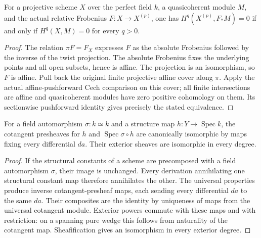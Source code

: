 \begin{theorem}
\label{thm:kn-relative-frobenius-pushforward-cohomology}
\leanok
{}
For a projective scheme $X$ over the perfect field $k$, a quasicoherent
module $M$, and the actual relative Frobenius $F:X\to X^{(p)}$, one has
$H^q(X^{(p)},F_*M)=0$ if and only if $H^q(X,M)=0$ for every $q>0$.
\end{theorem}
\begin{proof}
The relation $\pi F=F_X$ expresses $F$ as the absolute Frobenius
followed by the inverse of the twist projection.  The absolute
Frobenius fixes the underlying points and all open subsets, hence
is affine.  The projection is an isomorphism, so $F$ is affine.
Pull back the original finite projective affine cover along $\pi$.
Apply the actual affine-pushforward Cech comparison on this cover;
all finite intersections are affine and quasicoherent modules have
zero positive cohomology on them.  Its sectionwise pushforward
identity gives precisely the stated equivalence.
\end{proof}

\begin{lemma}
\label{lem:kn-field-automorphism-differentials}
\leanok
For a field automorphism $\sigma:k\simeq k$ and a structure map
$h:Y\to\operatorname{Spec}k$, the cotangent presheaves for $h$ and
$\operatorname{Spec}\sigma\circ h$ are canonically isomorphic by maps
fixing every differential $da$.  Their exterior sheaves are isomorphic
in every degree.
\end{lemma}
\begin{proof}
If the structural constants of a scheme are precomposed with a field
automorphism $\sigma$, their image is unchanged.  Every derivation
annihilating one structural constant map therefore annihilates the
other.  The universal properties produce inverse cotangent-presheaf
maps, each sending every differential $da$ to the same $da$.  Their
composites are the identity by uniqueness of maps from the universal
cotangent module.  Exterior powers commute with these maps and with
restriction: on a spanning pure wedge this follows from naturality of
the cotangent map.  Sheafification gives an isomorphism in every exterior degree.
\end{proof}

